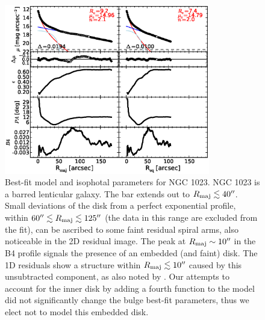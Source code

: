 \documentclass[preprint2]{emulateapj}
\newcommand{\fitfigurewidth}{0.8\textwidth}
\begin{document}
  \begin{figure}[h]
  \begin{center}
  \includegraphics[width=\fitfigurewidth]{images/n1023_1Dfit.eps}
  \caption{Best-fit model and isophotal parameters for NGC 1023.
  NGC 1023 is a barred lenticular galaxy. 
  The bar extends out to $R_{\rm maj} \lesssim 40''$.
  Small deviations of the disk from a perfect exponential profile, 
  within $60'' \lesssim R_{\rm maj} \lesssim 125''$ (the data in this range are excluded from the fit), 
  can be ascribed to some faint residual spiral arms, also noticeable in the 2D residual image. 
  The peak at $R_{\rm maj} \sim 10''$ in the B4 profile signals the presence of an embedded (and faint) disk.
  The 1D residuals show a structure within $R_{\rm maj} \lesssim 10''$ caused by this unsubtracted 
  component, as also noted by \cite{lasker2014data}.
  Our attempts to account for the inner disk by adding a fourth function to the model 
  did not significantly change the bulge best-fit parameters,
  thus we elect not to model this embedded disk. 
  }
  \end{center}
  \end{figure}
\end{document}
